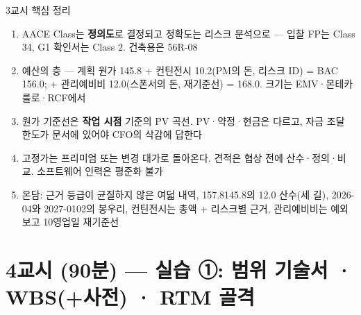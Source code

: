 \begin{frame}{3교시 핵심 정리}
\begin{enumerate}
\item AACE Class는 \textbf{정의도}로 결정되고 정확도는 리스크 분석으로 — 입찰 FP는 Class 3\til{}4, G1 확인서는 Class 2. 건축용은 56R-08
\item 예산의 층 — 계획 원가 145.8 + 컨틴전시 10.2(PM의 돈, 리스크 ID) = BAC 156.0; + 관리예비비 12.0(스폰서의 돈, 재기준선) = 168.0. 크기는 EMV·몬테카를로·RCF에서
\item 원가 기준선은 \textbf{작업 시점} 기준의 PV 곡선. PV·약정·현금은 다르고, 자금 조달 한도가 문서에 있어야 CFO의 삭감에 답한다
\item 고정가는 프리미엄 또는 변경 대가로 돌아온다. 견적은 협상 전에 산수·정의·비교. 소프트웨어 인력은 평준화 불가
\item 온담: 근거 등급이 균질하지 않은 여덟 내역, 157.8\ra{}145.8의 12.0 산수(세 길), 2026-04와 2027-01\til{}02의 봉우리, 컨틴전시는 총액 + 리스크별 근거, 관리예비비는 예외 보고 \ra{} 10영업일 \ra{} 재기준선
\end{enumerate}
\end{frame}

\section{4교시 (90분) — 실습 ①: 범위 기술서 · WBS(+사전) · RTM 골격}

